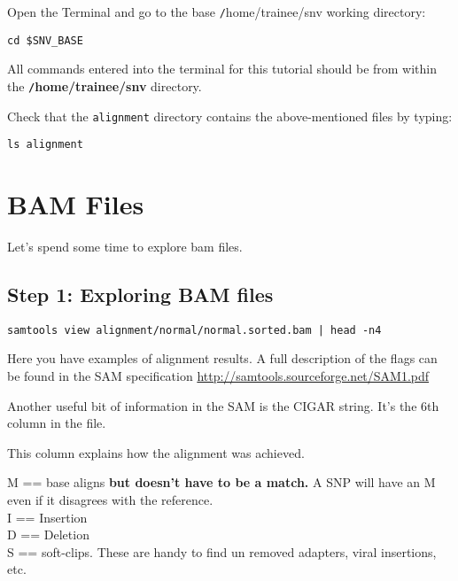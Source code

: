 \begin{steps}
Open the Terminal and go to the base \texttt/home/trainee/snv working directory:
\begin{lstlisting}
cd $SNV_BASE
\end{lstlisting}
\end{steps}

\begin{warning}
  All commands entered into the terminal for this tutorial should be from within the
  \textbf{\texttt/home/trainee/snv} directory.
\end{warning}

\begin{steps}
Check that the \texttt{alignment} directory contains the above-mentioned files by typing:
\begin{lstlisting}
ls alignment
\end{lstlisting}
\end{steps}




\section{BAM Files}

Let's spend some time to explore bam files.

\subsection{Step 1: Exploring BAM files}

\begin{steps}
\begin{lstlisting}
samtools view alignment/normal/normal.sorted.bam | head -n4
\end{lstlisting}
\end{steps}

Here you have examples of alignment results.
A full description of the flags can be found in the SAM specification
\url{http://samtools.sourceforge.net/SAM1.pdf}

Another useful bit of information in the SAM is the CIGAR string.
It's the 6th column in the file. 

This column explains how the alignment was achieved.
 
        M == base aligns \textbf{but doesn't have to be a match.} A SNP will have an M even if it disagrees with the reference.\\
        I == Insertion\\
        D == Deletion\\
        S == soft-clips. These are handy to find un removed adapters, viral insertions, etc.


